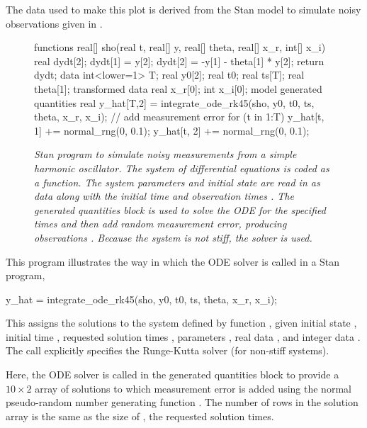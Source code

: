 The data used to make this plot is derived from the Stan model to
simulate noisy observations given in .
%
\begin{figure}
\begin{stancode}
functions {
  real[] sho(real t,
             real[] y,
             real[] theta,
             real[] x_r,
             int[] x_i) {
    real dydt[2];
    dydt[1] = y[2];
    dydt[2] = -y[1] - theta[1] * y[2];
    return dydt;
  }
}
data {
  int<lower=1> T;
  real y0[2];
  real t0;
  real ts[T];
  real theta[1];
}
transformed data {
  real x_r[0];
  int x_i[0];
}
model {
}
generated quantities {
  real y_hat[T,2] = integrate_ode_rk45(sho, y0, t0, ts, theta, x_r, x_i);
  // add measurement error
  for (t in 1:T) {
    y_hat[t, 1] += normal_rng(0, 0.1);
    y_hat[t, 2] += normal_rng(0, 0.1);
  }
}
\end{stancode}
\vspace*{-0.2in}
\caption{\small\it Stan program to simulate noisy measurements from a
  simple harmonic oscillator.  The system of differential equations is
  coded as a function.  The system parameters  and initial
  state  are read in as data along with the initial time
   and observation times . The generated quantities
  block is used to solve the ODE for the specified times and then add
  random measurement error, producing observations .
  Because the system is not stiff, the  solver is used.}\label{sho-sim.figure}
\end{figure}

This program illustrates the way in which the ODE solver is called in
a Stan program,
%
\begin{stancode}
y_hat = integrate_ode_rk45(sho, y0, t0, ts, theta, x_r, x_i);
\end{stancode}
%
This assigns the solutions to the system defined by function
, given initial state , initial time ,
requested solution times , parameters , real data
, and integer data .  The call explicitly
specifies the Runge-Kutta solver (for non-stiff systems).

Here, the ODE solver is called in the generated quantities block to
provide a $10 \times 2$ array of solutions  to
which measurement error is added using the normal pseudo-random number
generating function .  The number of rows in the
solution array is the same as the size of , the requested
solution times.

